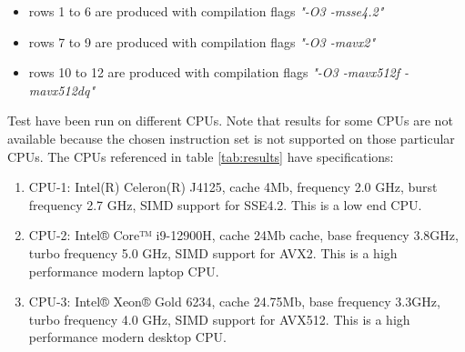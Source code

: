 \documentclass[preprint,1p,times]{elsarticle}
\begin{document}
\begin{itemize}
    \item rows 1 to 6 are produced with compilation flags \textit{"-O3 -msse4.2"}
    \item rows 7 to 9 are produced with compilation flags \textit{"-O3 -mavx2"}
    \item rows 10 to 12 are produced with compilation flags \textit{"-O3 -mavx512f -mavx512dq"}
\end{itemize}
Test have been run on different CPUs. Note that results for some CPUs are not available because the chosen instruction set is not supported on those particular CPUs. The CPUs referenced in table \ref{tab:results} have specifications:
\begin{enumerate}
    \item CPU-1: Intel(R) Celeron(R) J4125, cache 4Mb, frequency 2.0 GHz, burst frequency 2.7 GHz, SIMD support for SSE4.2. This is a low end CPU.
    \item CPU-2: Intel® Core™ i9-12900H, cache 24Mb cache, base frequency 3.8GHz, turbo frequency 5.0 GHz, SIMD support for AVX2. This is a high performance modern laptop CPU.
    \item CPU-3: Intel® Xeon® Gold 6234, cache 24.75Mb, base frequency 3.3GHz, turbo frequency 4.0 GHz, SIMD support for AVX512. This is a high performance modern desktop CPU.
\end{enumerate}
\end{document}
